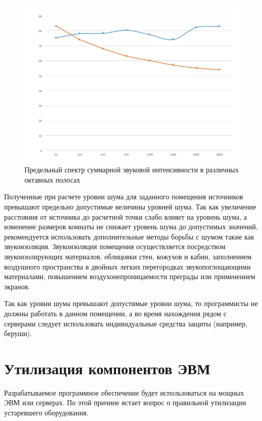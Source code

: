 \begin{figure}[h]
\caption{Предельный спектр суммарной звуковой интенсивности в различных октавных полосах}
\label{fig:predel_shum}
\centering
\includegraphics[scale=0.7]{pictures/shum_results}
\end{figure}

Полученные при расчете уровни шума для заданного помещения источников превышают предельно допустимые величины уровней шума. Так как увеличение расстояния от источника до расчетной точки слабо
влияет на уровень шума, а изменение размеров комнаты не снижает уровень шума до допустимых значений, рекомендуется использовать дополнительные методы борьбы с шумом такие как звукоизоляция. Звукоизоляция помещения осуществляется посредством звукоизолирующих материалов, облицовки
стен, кожухов и кабин, заполнением воздушного пространства в двойных
легких перегородках звукопоглощающими материалами, повышением воздухонепроницаемости преграды или применением экранов.

Так как уровни шума превышают допустимые уровни шума, то программисты не должны работать в данном помещении, а во время нахождения рядом с серверами следует использовать индивидуальные
средства защиты (например, беруши).

\section{Утилизация компонентов ЭВМ}
Разрабатываемое программное обеспечение будет использоваться на мощных ЭВМ или серверах. По этой причине встает вопрос о правильной утилизации устаревшего оборудования.

